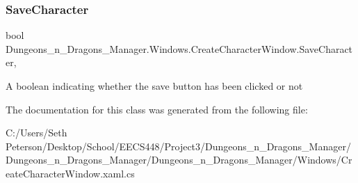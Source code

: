 \subsubsection{\texorpdfstring{Save\+Character}{SaveCharacter}}
{\footnotesize\ttfamily bool Dungeons\+\_\+n\+\_\+\+Dragons\+\_\+\+Manager.\+Windows.\+Create\+Character\+Window.\+Save\+Character\hspace{0.3cm}{\ttfamily [get]}, {\ttfamily [set]}}



A boolean indicating whether the save button has been clicked or not 



The documentation for this class was generated from the following file\+:\begin{DoxyCompactItemize}
\item 
C\+:/\+Users/\+Seth Peterson/\+Desktop/\+School/\+E\+E\+C\+S448/\+Project3/\+Dungeons\+\_\+n\+\_\+\+Dragons\+\_\+\+Manager/\+Dungeons\+\_\+n\+\_\+\+Dragons\+\_\+\+Manager/\+Dungeons\+\_\+n\+\_\+\+Dragons\+\_\+\+Manager/\+Windows/Create\+Character\+Window.\+xaml.\+cs\end{DoxyCompactItemize}
